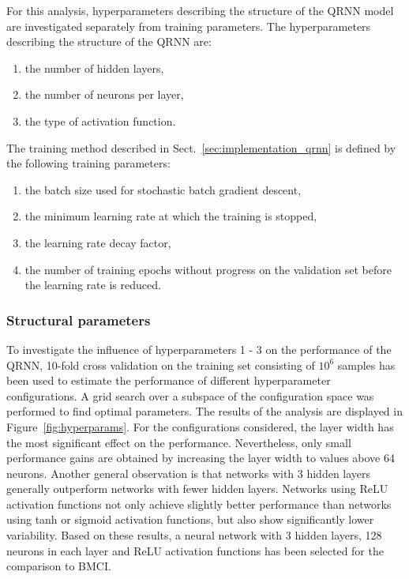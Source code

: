 \documentclass[journal abbreviation, manuscript]{copernicus}
\begin{document}
For this analysis, hyperparameters describing the structure of the QRNN model
are investigated separately from training parameters. The hyperparameters
describing the structure of the QRNN are:
\begin{enumerate}
  \item the number of hidden layers,
  \item the number of neurons per layer,
  \item the type of activation function.
  \setcounter{enumic}{\value{enumi}}
\end{enumerate}
The training method  described in Sect.~\ref{sec:implementation_qrnn} is
defined by the following training parameters:
\begin{enumerate}
  \setcounter{enumi}{\value{enumic}}
  \item the batch size used for stochastic batch gradient descent,
  \item the minimum learning rate at which the training is stopped,
  \item the learning rate decay factor,
  \item the number of training epochs without progress on the validation set
     before the learning rate is reduced.
\end{enumerate}

\subsubsection{Structural parameters}

  To investigate the influence of hyperparameters 1 - 3 on the performance of
  the QRNN, 10-fold cross validation on the training set consisting of $10^6$
  samples has been used to estimate the performance of different hyperparameter
  configurations. A grid search over a subspace of the configuration space was
  performed to find optimal parameters. The results of the analysis are
  displayed in Figure~\ref{fig:hyperparams}. For the configurations considered,
  the layer width has the most significant effect on the performance.
  Nevertheless, only small performance gains are obtained by increasing the
  layer width to values above 64 neurons. Another general observation is that
  networks with 3 hidden layers generally outperform networks with fewer hidden
  layers. Networks using ReLU activation functions not only achieve slightly
  better performance than networks using tanh or sigmoid activation functions,
  but also show significantly lower variability. Based on these results, a
  neural network with 3 hidden layers, 128 neurons in each layer and ReLU
  activation functions has been selected for the comparison to BMCI.
\end{document}
